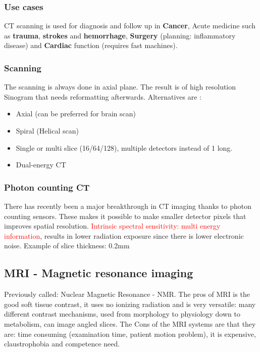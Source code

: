		\subsubsection{Use cases}
		CT scanning is used for diagnosis and follow up in \textbf{Cancer}, Acute medicine such as \textbf{trauma}, \textbf{strokes} and \textbf{hemorrhage}, \textbf{Surgery} (planning: inflammatory disease) and \textbf{Cardiac} function (requires fast machines).

		\subsubsection{Scanning}
		The scanning is always done in axial plane. The result is of high resolution Sinogram that needs reformatting afterwards. Alternatives are :
			\begin{itemize}
		 		\item Axial (can be preferred for brain scan)
		 		\item Spiral (Helical scan)
		 		\item Single or multi slice (16/64/128), multiple detectors instead of 1 long.
		 		\item Dual-energy CT
		 	\end{itemize} 		
		
		\subsubsection{Photon counting CT}
		There has recently been a major breakthrough in CT imaging thanks to photon counting sensors. These makes it possible to make smaller detector pixels that improves spatial resolution. \textcolor{red}{Intrinsic spectral sensitivity: multi energy information}, results in lower radiation exposure since there is lower electronic noise. Example of slice thickness: 0.2mm

	\subsection{MRI - Magnetic resonance imaging}
	Previously called: Nuclear Magnetic Resonance - NMR. The pros of MRI is the good soft tissue contrast, it uses no ionizing radiation and is very versatile: many different contrast mechanisms, used from morphology to physiology down to metabolism, can image angled slices. The Cons of the MRI systems are that they are: time consuming (examination time, patient motion problem), it is expensive, claustrophobia and competence need. 

